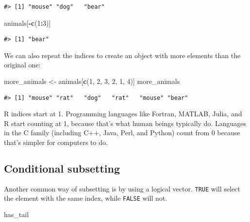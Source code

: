\documentclass[]{book}
\newenvironment{Shaded}{\begin{snugshade}}{\end{snugshade}}
\newcommand{\KeywordTok}[1]{\textcolor[rgb]{0.13,0.29,0.53}{\textbf{#1}}}
\newcommand{\DecValTok}[1]{\textcolor[rgb]{0.00,0.00,0.81}{#1}}
\newcommand{\StringTok}[1]{\textcolor[rgb]{0.31,0.60,0.02}{#1}}
\newcommand{\OperatorTok}[1]{\textcolor[rgb]{0.81,0.36,0.00}{\textbf{#1}}}
\newcommand{\NormalTok}[1]{#1}
\theoremstyle{definition}
\theoremstyle{definition}
\theoremstyle{definition}
\theoremstyle{remark}
\begin{document}
\begin{verbatim}
#> [1] "mouse" "dog"   "bear"
\end{verbatim}

\begin{Shaded}
\begin{Highlighting}[]
\NormalTok{animals[}\OperatorTok{-}\KeywordTok{c}\NormalTok{(}\DecValTok{1}\OperatorTok{:}\DecValTok{3}\NormalTok{)]}
\end{Highlighting}
\end{Shaded}

\begin{verbatim}
#> [1] "bear"
\end{verbatim}

We can also repeat the indices to create an object with more elements
than the original one:

\begin{Shaded}
\begin{Highlighting}[]
\NormalTok{more_animals <-}\StringTok{ }\NormalTok{animals[}\KeywordTok{c}\NormalTok{(}\DecValTok{1}\NormalTok{, }\DecValTok{2}\NormalTok{, }\DecValTok{3}\NormalTok{, }\DecValTok{2}\NormalTok{, }\DecValTok{1}\NormalTok{, }\DecValTok{4}\NormalTok{)]}
\NormalTok{more_animals}
\end{Highlighting}
\end{Shaded}

\begin{verbatim}
#> [1] "mouse" "rat"   "dog"   "rat"   "mouse" "bear"
\end{verbatim}

R indices start at 1. Programming languages like Fortran, MATLAB, Julia,
and R start counting at 1, because that's what human beings typically
do. Languages in the C family (including C++, Java, Perl, and Python)
count from 0 because that's simpler for computers to do.

\subsection{Conditional subsetting}\label{conditional-subsetting}

Another common way of subsetting is by using a logical vector.
\texttt{TRUE} will select the element with the same index, while
\texttt{FALSE} will not.

\begin{Shaded}
\begin{Highlighting}[]
\NormalTok{has_tail}
\end{Highlighting}
\end{Shaded}
\end{document}
